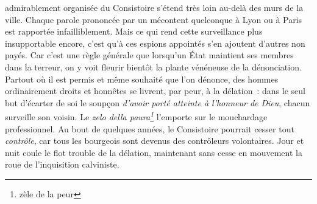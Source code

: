 \documentclass[french,twoside]{book} %
\newcommand\foreign[1]{\emph{#1}}
\begin{document}
admirablement organisée du Consistoire s’étend très loin au-delà des murs de la ville. Chaque parole prononcée par un mécontent quelconque à Lyon ou à Paris est rapportée infailliblement. Mais ce qui rend cette surveillance plus insupportable encore, c’est qu’à ces espions appointés s’en ajoutent d’autres non payés. Car c’est une règle générale que lorsqu’un État maintient ses membres dans la terreur, on y voit fleurir bientôt la plante vénéneuse de la dénonciation. Partout où il est permis et même souhaité que l’on dénonce, des hommes ordinairement droits et honnêtes se livrent, par peur, à la délation : dans le seul but d’écarter de soi le soupçon \emph{d’avoir porté atteinte à l’honneur de Dieu}, chacun surveille son voisin. Le \foreign{zelo della paura\footnote{zèle de la peur}} l’emporte sur le mouchardage professionnel. Au bout de quelques années, le Consistoire pourrait cesser tout \emph{contrôle}, car tous les bourgeois sont devenus des contrôleurs volontaires. Jour et nuit coule le flot trouble de la délation, maintenant sans cesse en mouvement la roue de l’inquisition calviniste.\par
\end{document}
